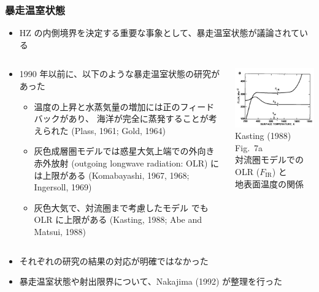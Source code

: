 \documentclass[aspectratio=149,9pt,fleqn]{beamer}
\begin{document}
\begin{frame}
	\frametitle{暴走温室状態}
	\begin{itemize}
		\item HZ の内側境界を決定する重要な事象として、暴走温室状態が議論されている
	\end{itemize}
	\begin{columns}[T,onlytextwidth]
		\begin{column}{.65\textwidth}
			\begin{itemize}
				\item 1990 年以前に、以下のような暴走温室状態の研究があった
					\begin{itemize}
						\item 温度の上昇と水蒸気量の増加には正のフィードバックがあり、
							海洋が完全に蒸発することが考えられた (Plass, 1961; Gold, 1964)
						\item 灰色成層圏モデルでは惑星大気上端での外向き赤外放射
							(outgoing longwave radiation: OLR) には上限がある
							(Komabayashi, 1967, 1968; Ingersoll, 1969)
						\item 灰色大気で、対流圏まで考慮したモデル
							でも OLR に上限がある
							(Kasting, 1988; Abe and Matsui, 1988)
					\end{itemize}
			\end{itemize}
		\end{column}
		\begin{column}{.3\textwidth}
			\centering\small
			\includegraphics[width=.95\textwidth]{kasting7a.png}\\
			Kasting (1988) Fig.\ 7a\\
			対流圏モデルでの OLR (\(F_{\mathrm{IR}}\)) と\\
			地表面温度の関係
		\end{column}
	\end{columns}
	\begin{itemize}
		\item それぞれの研究の結果の対応が明確ではなかった
		\item 暴走温室状態や射出限界について、Nakajima \etal (1992) が整理を行った
	\end{itemize}
\end{frame}
\end{document}
